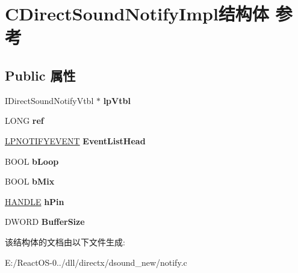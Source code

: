 \hypertarget{struct_c_direct_sound_notify_impl}{}\section{C\+Direct\+Sound\+Notify\+Impl结构体 参考}
\label{struct_c_direct_sound_notify_impl}
\subsection*{Public 属性}
\begin{DoxyCompactItemize}
\item 
\mbox{\label{struct_c_direct_sound_notify_impl_ad165c7549c9d69031fa1323b51de4af0}} 
I\+Direct\+Sound\+Notify\+Vtbl $\ast$ {\bfseries lp\+Vtbl}
\item 
\mbox{\label{struct_c_direct_sound_notify_impl_a4a1593119eb42369c21bf63f0772cf1f}} 
L\+O\+NG {\bfseries ref}
\item 
\mbox{\label{struct_c_direct_sound_notify_impl_a5159a91d351adbd549dbd563ba557d26}} 
\hyperlink{structtag_n_o_t_i_f_y_e_v_e_n_t}{L\+P\+N\+O\+T\+I\+F\+Y\+E\+V\+E\+NT} {\bfseries Event\+List\+Head}
\item 
\mbox{\label{struct_c_direct_sound_notify_impl_a47253e093a7ec81a61c87489caf5329c}} 
B\+O\+OL {\bfseries b\+Loop}
\item 
\mbox{\label{struct_c_direct_sound_notify_impl_a44a96f3ebdee424520edd6eb1c8a4dda}} 
B\+O\+OL {\bfseries b\+Mix}
\item 
\mbox{\label{struct_c_direct_sound_notify_impl_a212ee4ae91f3251146685f9d805eba2a}} 
\hyperlink{interfacevoid}{H\+A\+N\+D\+LE} {\bfseries h\+Pin}
\item 
\mbox{\label{struct_c_direct_sound_notify_impl_a5ce06427509b40bd90c1b0dbee52cc39}} 
D\+W\+O\+RD {\bfseries Buffer\+Size}
\end{DoxyCompactItemize}


该结构体的文档由以下文件生成\+:\begin{DoxyCompactItemize}
\item 
E\+:/\+React\+O\+S-\/0../dll/directx/dsound\+\_\+new/notify.\+c\end{DoxyCompactItemize}
